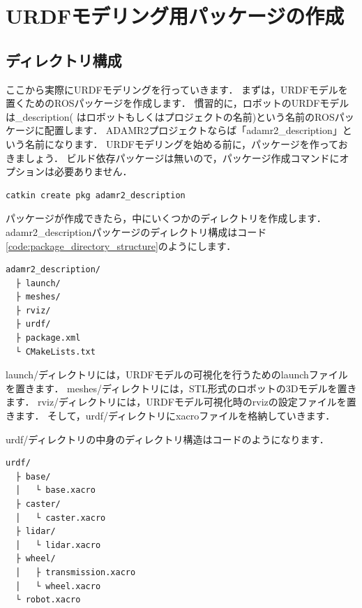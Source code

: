 \documentclass[{../../master}]{subfiles}
\begin{document}
\section{URDFモデリング用パッケージの作成}

\subsection{ディレクトリ構成}

ここから実際にURDFモデリングを行っていきます．
まずは，URDFモデルを置くためのROSパッケージを作成します．
慣習的に，ロボットのURDFモデルは\textsf{\*\_description}(\* はロボットもしくはプロジェクトの名前)という名前のROSパッケージに配置します．
ADAMR2プロジェクトならば「\textsf{adamr2\_description}」という名前になります．
URDFモデリングを始める前に，パッケージを作っておきましょう．
ビルド依存パッケージは無いので，パッケージ作成コマンドにオプションは必要ありません．

\begin{lstlisting}[language=sh, caption=Create a Package to put the URDF Model in]
catkin create pkg adamr2_description
\end{lstlisting}

パッケージが作成できたら，中にいくつかのディレクトリを作成します．
\textsf{adamr2\_description}パッケージのディレクトリ構成はコード\ref{code:package_directory_structure}のようにします．

\begin{lstlisting}[language=sh, caption=Directory Structure of adamr2\_description, label=code:package_directory_structure]
adamr2_description/
  ├ launch/
  ├ meshes/
  ├ rviz/
  ├ urdf/
  ├ package.xml
  └ CMakeLists.txt
\end{lstlisting}

\textsf{launch/}ディレクトリには，URDFモデルの可視化を行うためのlaunchファイルを置きます．
\textsf{meshes/}ディレクトリには，STL形式のロボットの3Dモデルを置きます．
\textsf{rviz/}ディレクトリには，URDFモデル可視化時の\textsf{rviz}の設定ファイルを置きます．
そして，\textsf{urdf/}ディレクトリにxacroファイルを格納していきます．

\textsf{urdf/}ディレクトリの中身のディレクトリ構造はコードのようになります．

\begin{lstlisting}[language=sh, caption=Directory Structure of \textsf{urdf/}, label=code:urdf_directory_structure]
urdf/
  ├ base/
  │   └ base.xacro
  ├ caster/
  │   └ caster.xacro
  ├ lidar/
  │   └ lidar.xacro
  ├ wheel/
  │   ├ transmission.xacro
  │   └ wheel.xacro
  └ robot.xacro
\end{lstlisting}
\end{document}
